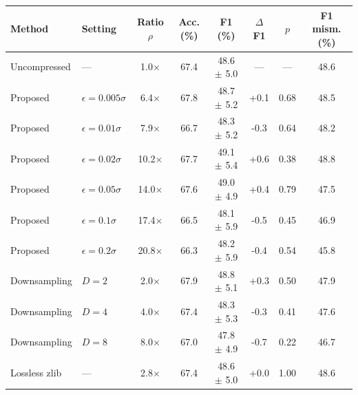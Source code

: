 \begin{tabular}{llcccccc}
\toprule
Method & Setting & Ratio $\rho$ & Acc. (\%) & F1 (\%) & $\Delta$F1 & $p$ & F1 mism. (\%) \\
\midrule
Uncompressed & --- & 1.0$\times$ & 67.4 & 48.6 $\pm$ 5.0 & --- & --- & 48.6 \\
Proposed & $\epsilon=0.005\sigma$ & 6.4$\times$ & 67.8 & 48.7 $\pm$ 5.2 & +0.1 & 0.68 & 48.5 \\
Proposed & $\epsilon=0.01\sigma$ & 7.9$\times$ & 66.7 & 48.3 $\pm$ 5.2 & -0.3 & 0.64 & 48.2 \\
Proposed & $\epsilon=0.02\sigma$ & 10.2$\times$ & 67.7 & 49.1 $\pm$ 5.4 & +0.6 & 0.38 & 48.8 \\
Proposed & $\epsilon=0.05\sigma$ & 14.0$\times$ & 67.6 & 49.0 $\pm$ 4.9 & +0.4 & 0.79 & 47.5 \\
Proposed & $\epsilon=0.1\sigma$ & 17.4$\times$ & 66.5 & 48.1 $\pm$ 5.9 & -0.5 & 0.45 & 46.9 \\
Proposed & $\epsilon=0.2\sigma$ & 20.8$\times$ & 66.3 & 48.2 $\pm$ 5.9 & -0.4 & 0.54 & 45.8 \\
Downsampling & $D=2$ & 2.0$\times$ & 67.9 & 48.8 $\pm$ 5.1 & +0.3 & 0.50 & 47.9 \\
Downsampling & $D=4$ & 4.0$\times$ & 67.4 & 48.3 $\pm$ 5.3 & -0.3 & 0.41 & 47.6 \\
Downsampling & $D=8$ & 8.0$\times$ & 67.0 & 47.8 $\pm$ 4.9 & -0.7 & 0.22 & 46.7 \\
Lossless zlib & --- & 2.8$\times$ & 67.4 & 48.6 $\pm$ 5.0 & +0.0 & 1.00 & 48.6 \\
\bottomrule
\end{tabular}
